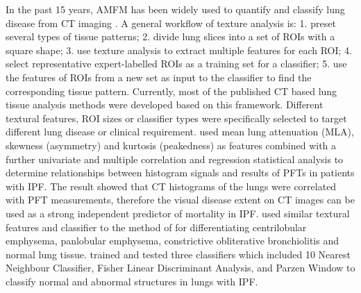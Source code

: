 In the past 15 years, AMFM has been widely used to quantify and classify lung disease from CT imaging \citep{van2002automatic,chabat2003obstructive,best2003quantitative,uchiyama2003quantitative,kim2005computer,zavaletta2006high,arzhaeva2007computer,best2008idiopathic,kim2010computer,kim2011quantitative,kim2015comparison}. A general workflow of texture analysis is: 1. preset several types of tissue patterns; 2. divide lung slices into a set of ROIs with a square shape; 3. use texture analysis to extract multiple features for each ROI; 4. select representative expert-labelled ROIs as a training set for a classifier; 5. use the features of ROIs from a new set as input to the classifier to find the corresponding tissue pattern. Currently, most of the published CT based lung tissue analysis methods were developed based on this framework. Different textural features, ROI sizes or classifier types were specifically selected to target different lung disease or clinical requirement. \cite{best2003quantitative,best2008idiopathic} used mean lung attenuation (MLA), skewness (asymmetry) and kurtosis (peakedness) as features combined with a further univariate and multiple correlation and regression statistical analysis to determine relationships between histogram signals and results of PFTs in patients with IPF. The result showed that CT histograms of the lungs were correlated with PFT measurements, therefore the visual disease extent on CT images can be used as a strong independent predictor of mortality in IPF. \cite{chabat2003obstructive} used similar textural features and classifier to the method of \cite{best2003quantitative,best2008idiopathic} for differentiating centrilobular emphysema, panlobular emphysema, constrictive obliterative bronchiolitis and normal lung tissue. \cite{zavaletta2007high} trained and tested three classifiers which included 10 Nearest Neighbour Classifier, Fisher Linear Discriminant Analysis, and Parzen Window to classify normal and abnormal structures in lungs with IPF. 

